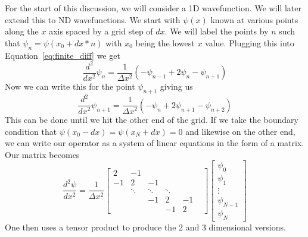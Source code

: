 \documentclass{article}
\begin{document}
For the start of this discussion, we will consider a 1D wavefunction. We will later extend this to ND wavefunctions. We start with $\psi(x)$ known at various points along the $x$ axis spaced by a grid step of $dx$. We will label the points by $n$ such that $\psi_n = \psi(x_0 + dx*n)$ with $x_0$ being the lowest $x$ value. Plugging this into Equation~\ref{eq:finite_diff} we get
\begin{equation}
    \frac{d^2}{dx^2}\psi_n = \frac{1}{\Delta x^2}\left(-\psi_{n-1}+2\psi_n-\psi_{n+1} \right)
    \label{eq:finite_diff_second_order}
\end{equation}
Now we can write this for the point $\psi_{n+1}$ giving us
\begin{equation}
    \frac{d^2}{dx^2}\psi_{n+1} = \frac{1}{\Delta x^2}\left(-\psi_{n}+2\psi_{n+1}-\psi_{n+2} \right)
    \label{eq:finite_diff_second_order_n+1}
\end{equation}
This can be done until we hit the other end of the grid. If we take the boundary condition that $\psi(x_0-dx)=\psi(x_N+dx)=0$ and likewise on the other end, we can write our operator as a system of linear equations in the form of a matrix. Our matrix becomes
\begin{equation}
\frac{d^2\psi}{dx^2} =
\frac{1}{\Delta x^2}
\begin{bmatrix}
    2 & -1 &  &  &   &  \\
    -1 & 2 & -1 &  &  &  \\
     & \ddots & \ddots & \ddots & \\
     &  & -1 & 2 & -1\\
     &   &  & -1 & 2
\end{bmatrix}
\begin{bmatrix}
    \psi_{0} \\
    \psi_{1} \\
    \vdots  \\
    \psi_{N-1}  \\
    \psi_{N}
\end{bmatrix}
\end{equation}
One then uses a tensor product to produce the 2 and 3 dimensional versions.
\end{document}
